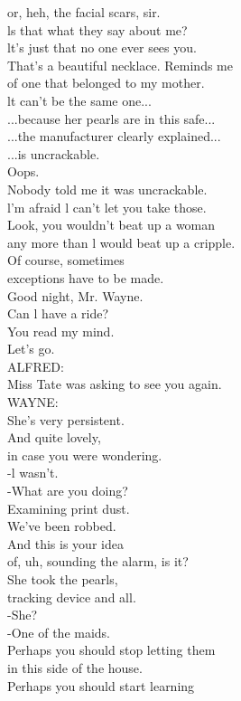 \documentclass{article}
\begin{document}
\begin{multicols}{3}
or, heh, the facial scars, sir.\\
ls that what they say about me?\\
lt's just that no one ever sees you.\\
That's a beautiful necklace. Reminds me\\
of one that belonged to my mother.\\
lt can't be the same one...\\
...because her pearls are in this safe...\\
...the manufacturer clearly explained...\\
...is uncrackable.\\
Oops.\\
Nobody told me it was uncrackable.\\
l'm afraid l can't let you take those.\\
Look, you wouldn't beat up a woman\\
any more than l would beat up a cripple.\\
Of course, sometimes\\
exceptions have to be made.\\
Good night, Mr. Wayne.\\
Can l have a ride?\\
You read my mind.\\
Let's go.\\
ALFRED:\\
Miss Tate was asking to see you again.\\
WAYNE:\\
She's very persistent.\\
And quite lovely,\\
in case you were wondering.\\
-l wasn't.\\
-What are you doing?\\
Examining print dust.\\
We've been robbed.\\
And this is your idea\\
of, uh, sounding the alarm, is it?\\
She took the pearls,\\
tracking device and all.\\
-She?\\
-One of the maids.\\
Perhaps you should stop letting them\\
in this side of the house.\\
Perhaps you should start learning\\

\end{multicols}
\end{document}
